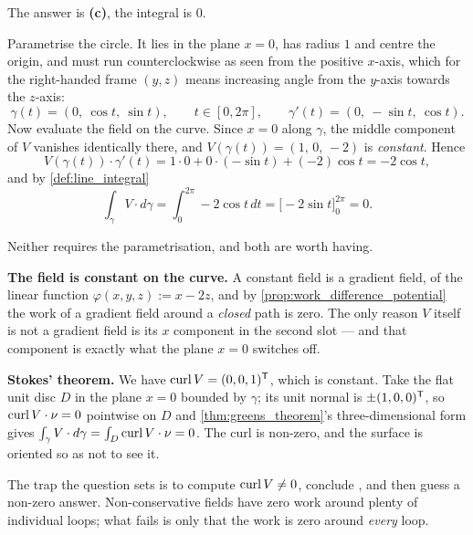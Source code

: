 \begin{exercisesolution}
\label{sol:kobel_line_integral_yz_circle}
The answer is \textbf{(c)}, the integral is $0$.

Parametrise the circle. It lies in the plane $x = 0$, has radius $1$ and centre the origin, and
must run counterclockwise as seen from the positive $x$-axis, which for the right-handed frame
$(y,z)$ means increasing angle from the $y$-axis towards the $z$-axis:
\[\gamma(t) = (0,\ \cos t,\ \sin t), \qquad t \in [0,2\pi], \qquad
  \gamma'(t) = (0,\ -\sin t,\ \cos t).\]
Now evaluate the field on the curve. Since $x = 0$ along $\gamma$, the middle component of $V$
vanishes identically there, and $V(\gamma(t)) = (1,\,0,\,-2)$ is \emph{constant}. Hence
\[V(\gamma(t))\cdot\gamma'(t) = 1\cdot 0 + 0\cdot(-\sin t) + (-2)\cos t = -2\cos t,\]
and by \cref{def:line_integral}
\[\int_\gamma V\cdot d\gamma = \int_0^{2\pi} -2\cos t\,dt = \big[-2\sin t\big]_0^{2\pi} = 0.\]
\begin{remark}
Neither requires the parametrisation, and both are worth having.

\textbf{The field is constant on the curve.} A constant field is a gradient field, of the linear
function $\varphi(x,y,z) := x - 2z$, and by \cref{prop:work_difference_potential} the work of a
gradient field around a \emph{closed} path is zero. The only reason $V$ itself is not a gradient
field is its $x$ component in the second slot --- and that component is exactly what the plane
$x=0$ switches off.

\textbf{Stokes' theorem.} We have $\operatorname{curl} V = (0,0,1)^{\mathsf{T}}$, which is constant. Take the flat unit
disc $D$ in the plane $x=0$ bounded by $\gamma$; its unit normal is $\pm(1,0,0)^{\mathsf{T}}$, so
$\operatorname{curl} V \cdot \nu = 0$ pointwise on $D$ and \cref{thm:greens_theorem}'s three-dimensional form
gives $\int_\gamma V\cdot d\gamma = \int_D \operatorname{curl} V\cdot\nu = 0$. The curl is non-zero, and the
surface is oriented so as not to see it.

The trap the question sets is to compute $\operatorname{curl} V \ne 0$, conclude , and then
guess a non-zero answer. Non-conservative fields have zero work around plenty of individual loops;
what fails is only that the work is zero around \emph{every} loop.
\end{remark}
\end{exercisesolution}

